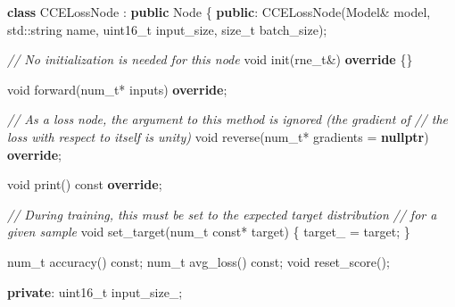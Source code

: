 \documentclass[
]{article}
\newenvironment{Shaded}{}{}
\newcommand{\AttributeTok}[1]{\textcolor[rgb]{0.49,0.56,0.16}{#1}}
\newcommand{\BuiltInTok}[1]{#1}
\newcommand{\CommentTok}[1]{\textcolor[rgb]{0.38,0.63,0.69}{\textit{#1}}}
\newcommand{\DataTypeTok}[1]{\textcolor[rgb]{0.56,0.13,0.00}{#1}}
\newcommand{\KeywordTok}[1]{\textcolor[rgb]{0.00,0.44,0.13}{\textbf{#1}}}
\newcommand{\NormalTok}[1]{#1}
\newcommand{\VariableTok}[1]{\textcolor[rgb]{0.10,0.09,0.49}{#1}}
\begin{document}
\begin{Shaded}
\begin{Highlighting}[]
\KeywordTok{class}\NormalTok{ CCELossNode : }\KeywordTok{public}\NormalTok{ Node}
\NormalTok{\{}
\KeywordTok{public}\NormalTok{:}
\NormalTok{    CCELossNode(Model\& model,}
                \BuiltInTok{std::}\NormalTok{string name,}
                \DataTypeTok{uint16\_t}\NormalTok{ input\_size,}
                \DataTypeTok{size\_t}\NormalTok{ batch\_size);}

    \CommentTok{// No initialization is needed for this node}
    \DataTypeTok{void}\NormalTok{ init(}\DataTypeTok{rne\_t}\NormalTok{\&) }\KeywordTok{override}\NormalTok{ \{\}}

    \DataTypeTok{void}\NormalTok{ forward(}\DataTypeTok{num\_t}\NormalTok{* inputs) }\KeywordTok{override}\NormalTok{;}

    \CommentTok{// As a loss node, the argument to this method is ignored (the gradient of}
    \CommentTok{// the loss with respect to itself is unity)}
    \DataTypeTok{void}\NormalTok{ reverse(}\DataTypeTok{num\_t}\NormalTok{* gradients = }\KeywordTok{nullptr}\NormalTok{) }\KeywordTok{override}\NormalTok{;}

    \DataTypeTok{void}\NormalTok{ print() }\AttributeTok{const} \KeywordTok{override}\NormalTok{;}

    \CommentTok{// During training, this must be set to the expected target distribution}
    \CommentTok{// for a given sample}
    \DataTypeTok{void}\NormalTok{ set\_target(}\DataTypeTok{num\_t} \AttributeTok{const}\NormalTok{* target)}
\NormalTok{    \{}
        \VariableTok{target\_}\NormalTok{ = target;}
\NormalTok{    \}}

    \DataTypeTok{num\_t}\NormalTok{ accuracy() }\AttributeTok{const}\NormalTok{;}
    \DataTypeTok{num\_t}\NormalTok{ avg\_loss() }\AttributeTok{const}\NormalTok{;}
    \DataTypeTok{void}\NormalTok{ reset\_score();}

\KeywordTok{private}\NormalTok{:}
    \DataTypeTok{uint16\_t} \VariableTok{input\_size\_}\NormalTok{;}


\end{Highlighting}
\end{Shaded}
\end{document}
